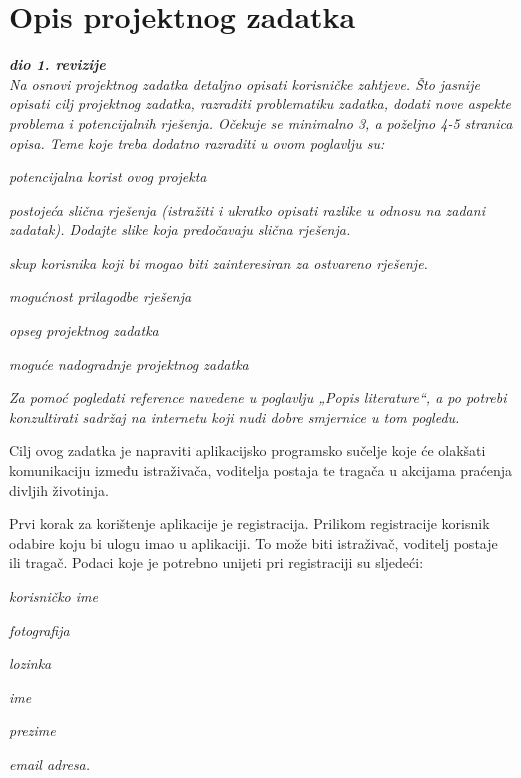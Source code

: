 \chapter{Opis projektnog zadatka}
		
		\textbf{\textit{dio 1. revizije}}\\
		
		\textit{Na osnovi projektnog zadatka detaljno opisati korisničke zahtjeve. Što jasnije opisati cilj projektnog zadatka, razraditi problematiku zadatka, dodati nove aspekte problema i potencijalnih rješenja. Očekuje se minimalno 3, a poželjno 4-5 stranica opisa.	Teme koje treba dodatno razraditi u ovom poglavlju su:}
		\begin{packed_item}
			\item \textit{potencijalna korist ovog projekta}
			\item \textit{postojeća slična rješenja (istražiti i ukratko opisati razlike u odnosu na zadani zadatak). Dodajte slike koja predočavaju slična rješenja.}
			\item \textit{skup korisnika koji bi mogao biti zainteresiran za ostvareno rješenje.}
			\item \textit{mogućnost prilagodbe rješenja }
			\item \textit{opseg projektnog zadatka}
			\item \textit{moguće nadogradnje projektnog zadatka}
		\end{packed_item}
		
		\textit{Za pomoć pogledati reference navedene u poglavlju „Popis literature“, a po potrebi konzultirati sadržaj na internetu koji nudi dobre smjernice u tom pogledu.}
		\eject
		
		
		Cilj ovog zadatka je napraviti aplikacijsko programsko sučelje koje će olakšati komunikaciju između istraživača, voditelja postaja te tragača u akcijama praćenja divljih životinja.
		
		Prvi korak za korištenje aplikacije je registracija. Prilikom registracije korisnik odabire koju bi ulogu imao u aplikaciji. To može biti istraživač, voditelj postaje ili tragač.
		Podaci koje je potrebno unijeti pri registraciji su sljedeći:
		\begin{packed_item}
			\item \textit{korisničko ime}
			\item \textit{fotografija}
			\item \textit{lozinka}
			\item \textit{ime}
			\item \textit{prezime}
			\item \textit{email adresa.}
		\end{packed_item}
		
